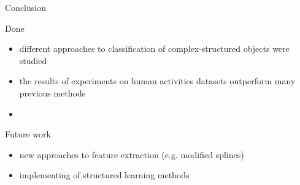 \documentclass{beamer}
\begin{document}
\begin{frame}{Conclusion}
	\begin{block}{Done}
		\begin{itemize}
			\item different approaches to classification of complex-structured objects were studied
			\item the results of experiments on human activities datasets outperform many previous methods
			\item 
		\end{itemize}
	\end{block}
	\begin{block}{Future work}
		\begin{itemize}
			\item new approaches to feature extraction (e.g. modified splines)
			\item implementing of structured learning methods
		\end{itemize}
	
	\end{block}
\end{frame}
\end{document}

